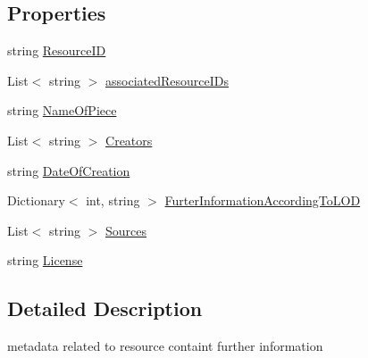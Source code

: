 \subsection*{Properties}
\begin{DoxyCompactItemize}
\item 
string \mbox{\hyperlink{class_meta_data_a1bbd18efe27fdbeb0ee920414caa12c8}{Resource\+ID}}
\item 
List$<$ string $>$ \mbox{\hyperlink{class_meta_data_a1cdef15bd6753836cd2baa6533ebc306}{associated\+Resource\+I\+Ds}}
\item 
string \mbox{\hyperlink{class_meta_data_abb2ca2ab73300089a68d6c38f5610949}{Name\+Of\+Piece}}
\item 
List$<$ string $>$ \mbox{\hyperlink{class_meta_data_a498505a8b02fe2f7413092c42d81e8a7}{Creators}}
\item 
string \mbox{\hyperlink{class_meta_data_a693a56223c266f028740844681877e45}{Date\+Of\+Creation}}
\item 
Dictionary$<$ int, string $>$ \mbox{\hyperlink{class_meta_data_ab307dc4b5f061d3c8f610048176a6520}{Furter\+Information\+According\+To\+L\+OD}}
\item 
List$<$ string $>$ \mbox{\hyperlink{class_meta_data_acb76cf00c140a3da86a35ff350d0c05f}{Sources}}
\item 
string \mbox{\hyperlink{class_meta_data_a43c021341f7ac2b2237041aae37bd3db}{License}}
\end{DoxyCompactItemize}


\subsection{Detailed Description}
metadata related to resource containt further information 



